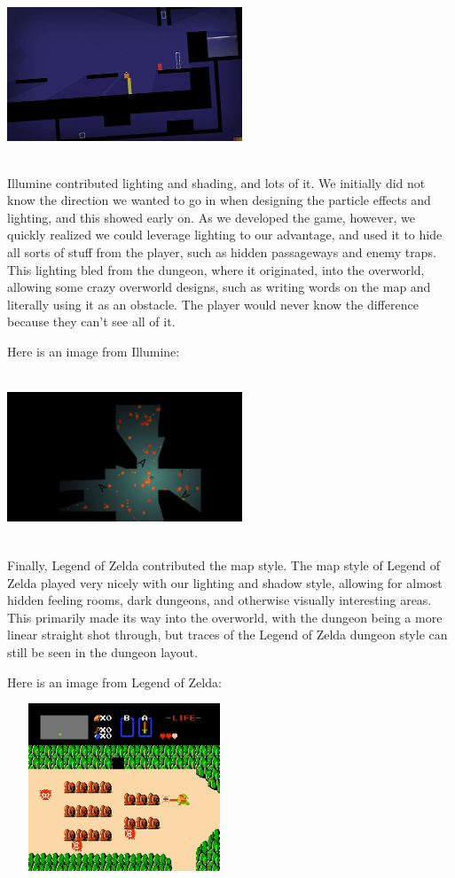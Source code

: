 \documentclass{sigchi}
\begin{document}
\includegraphics[width=7cm, height=5cm]{./figures/thomas.jpg}

Illumine contributed lighting and shading, and lots of it.  We initially did not know the direction we wanted to go in when designing the particle effects and lighting, and this
showed early on.  As we developed the game, however, we quickly realized we could leverage lighting to our advantage, and used it to hide all sorts of stuff from the player, such
as hidden passageways and enemy traps.  This lighting bled from the dungeon, where it originated, into the overworld, allowing some crazy overworld designs, such as writing words on the 
map and literally using it as an obstacle.  The player would never know the difference because they can't see all of it.

Here is an image from Illumine:

\includegraphics*[width=7cm, height=5cm]{./figures/illumine.png}

Finally, Legend of Zelda contributed the map style.  The map style of Legend of Zelda played very nicely with our lighting and shadow style, allowing for almost hidden feeling rooms,
dark dungeons, and otherwise visually interesting areas.  This primarily made its way into the overworld, with the dungeon being a more linear straight shot through, but traces 
of the Legend of Zelda dungeon style can still be seen in the dungeon layout.

Here is an image from Legend of Zelda:

\includegraphics*[width=7cm, height=5cm]{./figures/zelda.png}
\end{document}
